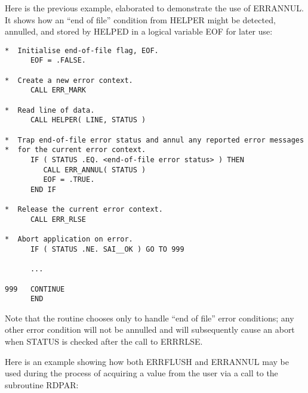 \documentclass[twoside,11pt]{article}
\renewcommand{\_}{\texttt{\symbol{95}}}
\begin{document}
Here is the previous example, elaborated to demonstrate the use of ERR\_ANNUL.
It shows how an ``end of file'' condition from HELPER might be detected,
annulled, and stored by HELPED in a logical variable EOF for later use:

\begin {small}
\begin{verbatim}
*  Initialise end-of-file flag, EOF.
      EOF = .FALSE.

*  Create a new error context.
      CALL ERR_MARK

*  Read line of data.
      CALL HELPER( LINE, STATUS )

*  Trap end-of-file error status and annul any reported error messages
*  for the current error context.
      IF ( STATUS .EQ. <end-of-file error status> ) THEN
         CALL ERR_ANNUL( STATUS )
         EOF = .TRUE.
      END IF

*  Release the current error context.
      CALL ERR_RLSE

*  Abort application on error.
      IF ( STATUS .NE. SAI__OK ) GO TO 999

      ...

999   CONTINUE
      END
\end{verbatim}
\end {small}

Note that the routine chooses only to handle ``end of file'' error
conditions; any other error condition will not be annulled and will
subsequently cause an abort when STATUS is checked after the call to
ERR\_RLSE.

Here is an example showing
how both ERR\_FLUSH and ERR\_ANNUL may be used during the process of
acquiring a value from the user via a call to the subroutine RDPAR:
\end{document}
